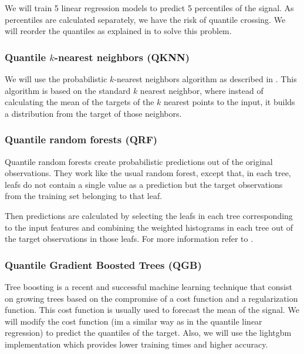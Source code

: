 \documentclass[a4paper,3p,sort&compress]{elsarticle}
\begin{document}
We will train 5 linear regression models to predict 5 percentiles of
the signal. As percentiles are calculated separately, we have the risk
of quantile crossing.  We will reorder the quantiles as explained in
\cite{cross} to solve this problem.

\subsubsection{Quantile $k$-nearest neighbors (QKNN)}

We will use the probabilistic $k$-nearest neighbors algorithm as
described in \cite{quantileknnmangalova}.  This algorithm is based on
the standard $k$ nearest neighbor, where instead of calculating the
mean of the targets of the $k$ nearest points to the input, it builds
a distribution from the target of those neighbors.

\subsubsection{Quantile random forests (QRF)}

Quantile random forests create probabilistic predictions out of the
original observations. They work like the usual random forest, except
that, in each tree, leafs do not contain a single value as a
prediction but the target observations from the training set belonging
to that
leaf.

Then predictions are calculated by selecting the leafs in each tree
corresponding to the input features and combining the weighted
histograms in each tree out of the target observations in those leafs.
For more information refer to \cite{quantregforests}.

\subsubsection{Quantile Gradient Boosted Trees (QGB)}

Tree boosting \cite{friedman_greedy_2001} is a recent and successful
machine learning technique that consist on growing trees based on the
compromise of a cost function and a regularization function. This cost
function is usually used to forecast the mean of the signal. We will
modify the cost function (im a similar way as in the quantile linear
regression) to predict the quantiles of the target. Also, we will use 
the lightgbm implementation \cite{ke_lightgbm:_2017} which provides 
lower training times and higher accuracy.
\end{document}
